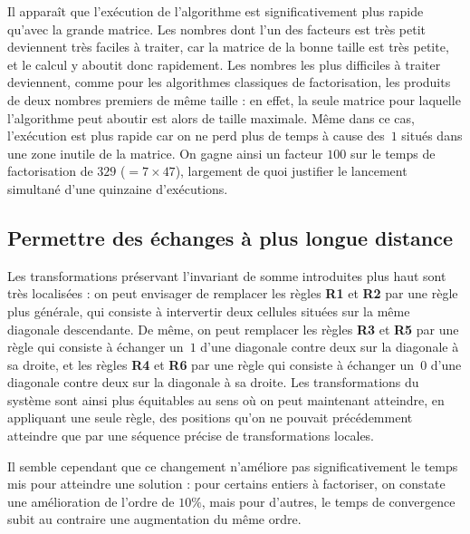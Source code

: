 \documentclass[11pt, openany, a4paper]{article}
\begin{document}
\medskip
Il apparaît que l'exécution de l'algorithme est significativement plus rapide qu'avec la grande matrice. Les nombres dont l'un des facteurs est très petit deviennent très faciles à traiter, car la matrice de la bonne taille est très petite, et le calcul y aboutit donc rapidement. Les nombres les plus difficiles à traiter deviennent, comme pour les algorithmes classiques de factorisation, les produits de deux nombres premiers de même taille : en effet, la seule matrice pour laquelle l'algorithme peut aboutir est alors de taille maximale. Même dans ce cas, l'exécution est plus rapide car on ne perd plus de temps à cause des~$1$ situés dans une zone inutile de la matrice. On gagne ainsi un facteur $100$ sur le temps de factorisation de $329$ ($ =7\times 47$), largement de quoi justifier le lancement simultané d'une quinzaine d'exécutions. %


\subsection{Permettre des échanges à plus longue distance}

Les transformations préservant l'invariant de somme introduites plus haut sont très localisées : on peut envisager de remplacer les règles \textbf{R1} et \textbf{R2} par une règle plus générale, qui consiste à intervertir deux cellules situées sur la même diagonale descendante. De même, on peut remplacer les règles \textbf{R3} et \textbf{R5} par une règle qui consiste à échanger un~$1$ d'une diagonale contre deux sur la diagonale à sa droite, et les règles \textbf{R4} et \textbf{R6} par une règle qui consiste à échanger un~$0$ d'une diagonale contre deux sur la diagonale à sa droite. Les transformations du système sont ainsi plus équitables au sens où on peut maintenant atteindre, en appliquant une seule règle, des positions qu'on ne pouvait précédemment atteindre que par une séquence précise de transformations locales. 

Il semble cependant que ce changement n'améliore pas significativement le temps mis pour atteindre une solution : pour certains entiers à factoriser, on constate une amélioration de l'ordre de $10\%$, mais pour d'autres, le temps de convergence subit au contraire une augmentation du même ordre.   

\end{document}
